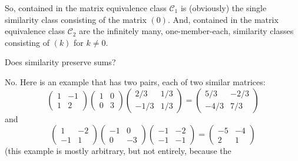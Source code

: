 \begin{exercises}
\begin{answer}
      So, contained in the matrix equivalence class
      $\mathscr{C}_1$ is (obviously) the single 
      similarity class consisting of the matrix $(0)$.
      And, contained in the matrix equivalence class $\mathscr{C}_2$ are the
      infinitely many, one-member-each, similarity classes consisting of
      $(k)$ for $k\neq0$.  
    \end{answer}
  \item 
    Does similarity preserve sums?
    \begin{answer}
      No.
      Here is an example that has two pairs, each of two similar matrices:
      \begin{equation*}
         \begin{pmatrix}
            1  &-1  \\
            1  &2
         \end{pmatrix}
         \begin{pmatrix}
            1  &0   \\
            0  &3
         \end{pmatrix}
         \begin{pmatrix}
            2/3  &1/3   \\
           -1/3  &1/3
         \end{pmatrix}
         =
         \begin{pmatrix}
            5/3  &-2/3  \\
           -4/3  &7/3
         \end{pmatrix}
      \end{equation*}
      and
      \begin{equation*}
         \begin{pmatrix}
            1  &-2  \\
           -1  &1
         \end{pmatrix}
         \begin{pmatrix}
           -1  &0   \\
            0  &-3
         \end{pmatrix}
         \begin{pmatrix}
            -1  &-2   \\
            -1  &-1
         \end{pmatrix}
         =
         \begin{pmatrix}
            -5  &-4   \\
             2  &1
         \end{pmatrix}
      \end{equation*}
      (this example is mostly arbitrary, but not entirely, because the

\end{answer}
\end{exercises}
